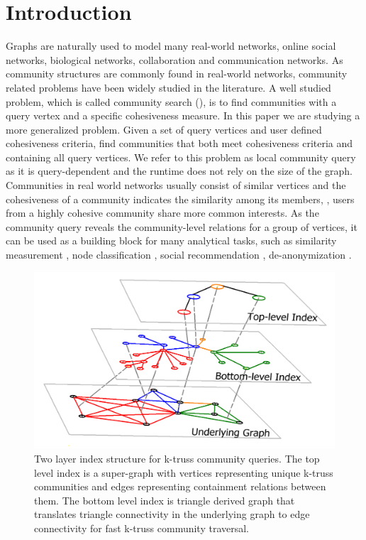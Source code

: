 \section{Introduction}
\label{introduction}

Graphs are naturally used to model many real-world networks, \eg online social networks, biological networks, collaboration and communication networks. As community structures are commonly found in real-world networks, community related problems have been widely studied in the literature. A well studied problem, which is called community search (\cite{huang2014querying, akbas2017truss, huang2015approximate, lee2016query, sozio2010community, cui2014local, li2015influential, barbieri2015efficient}), is to find communities with a query vertex and a specific cohesiveness measure. In this paper we are studying a more generalized problem. Given a set of query vertices and user defined cohesiveness criteria, find communities that both meet cohesiveness criteria and containing all query vertices. We refer to this problem as local community query as it is query-dependent and the runtime does not rely on the size of the graph. Communities in real world networks usually consist of similar vertices and the cohesiveness of a community indicates the similarity among its members, \eg, users from a highly cohesive community share more common interests. As the community query reveals the community-level relations for a group of vertices, it can be used as a building block for many analytical tasks, such as similarity measurement \cite{tsitsulin2018verse}, node classification \cite{henderson2011s}, social recommendation \cite{liu2018connect}, de-anonymization \cite{wu2018social}.

\begin{figure}[ht]
    \centering
    \includegraphics[width=\linewidth]{./figures/illustration_main.png}
    \caption{Two layer index structure for k-truss community queries. The top level index is a super-graph with vertices representing unique k-truss communities and edges representing containment relations between them. The bottom level index is triangle derived graph that translates triangle connectivity in the underlying graph to edge connectivity for fast k-truss community traversal.}
    \label{fig:illustration_main}
\end{figure}

